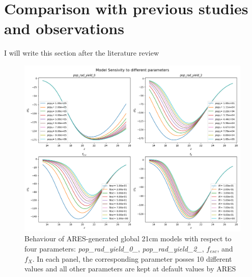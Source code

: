 \documentclass[12pt, TexShade, letterpaper]{report}
\begin{document}
\section{Comparison with previous studies and observations}
I will write this section after the literature review
\begin{figure}[h!]
\centering
\includegraphics[scale =0.5]{sensivity.png}
\caption[Behaviour of global 21cm model with respect to chosen parameters]{Behaviour of ARES-generated global 21cm models with respect to four parameters: \emph{pop\_rad\_yield\_0\_}, \emph{pop\_rad\_yield\_2\_}, $f_{esc}$, and $f_X$. In each panel, the corresponding parameter posses 10 different values and all other parameters are kept at default values by ARES}
\label{fig:sensivity}
\end{figure}
\end{document}
